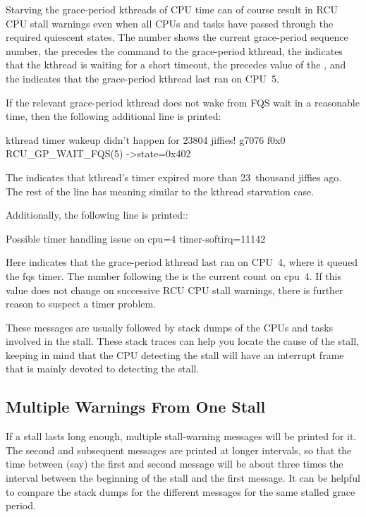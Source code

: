 Starving the grace-period kthreads of CPU time can of course result
in RCU CPU stall warnings even when all CPUs and tasks have passed
through the required quiescent states.
The  number shows the current
grace-period sequence number, the  precedes the  command
to the grace-period kthread, the  indicates that the
kthread is waiting for a short timeout, the  precedes value of the
 , and the  indicates that the grace-period
kthread last ran on CPU~5.

If the relevant grace-period kthread does not wake from FQS wait in a
reasonable time, then the following additional line is printed:

\begin{VerbatimU}[breaklines=true]
	kthread timer wakeup didn't happen for 23804 jiffies! g7076 f0x0 RCU_GP_WAIT_FQS(5) ->state=0x402
\end{VerbatimU}

The  indicates that kthread's timer expired more than 23~thousand
jiffies ago.
The rest of the line has meaning similar to the kthread
starvation case.

Additionally, the following line is printed::

\begin{VerbatimU}
	Possible timer handling issue on cpu=4 timer-softirq=11142
\end{VerbatimU}

Here  indicates that the grace-period kthread last ran on CPU~4,
where it queued the fqs timer.
The number following the 
is the current  count on cpu~4.
If this value does not
change on successive RCU CPU stall warnings, there is further reason to
suspect a timer problem.

These messages are usually followed by stack dumps of the CPUs and tasks
involved in the stall.
These stack traces can help you locate the cause
of the stall, keeping in mind that the CPU detecting the stall will have
an interrupt frame that is mainly devoted to detecting the stall.


\subsection{Multiple Warnings From One Stall}

If a stall lasts long enough, multiple stall-warning messages will
be printed for it.
The second and subsequent messages are printed at
longer intervals, so that the time between (say) the first and second
message will be about three times the interval between the beginning
of the stall and the first message.
It can be helpful to compare the
stack dumps for the different messages for the same stalled grace period.


